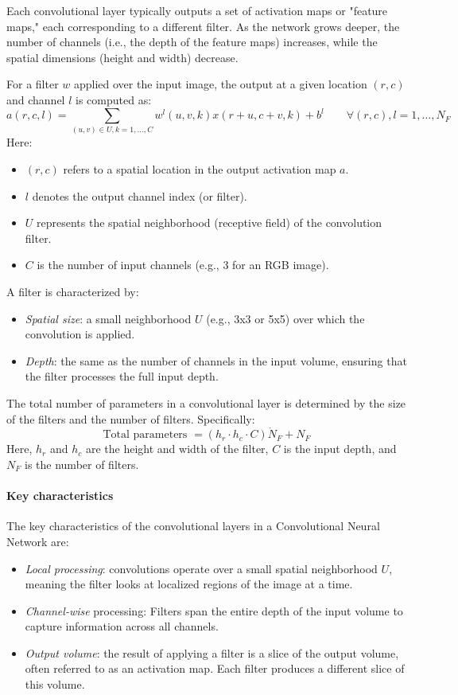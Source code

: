 Each convolutional layer typically outputs a set of activation maps or "feature maps," each corresponding to a different filter. 
As the network grows deeper, the number of channels (i.e., the depth of the feature maps) increases, while the spatial dimensions (height and width) decrease.

For a filter $w$ applied over the input image, the output at a given location $(r, c)$ and channel $l$ is computed as:
\[a(r,c,l)=\sum_{(u,v)\in U,k=1,\dots,C}w^l(u,v,k)x(r+u,c+v,k)+b^l\qquad\forall(r,c),l=1,\dots,N_F\]
Here: 
\begin{itemize}
    \item $(r,c)$ refers to a spatial location in the output activation map $a$.
    \item $l$ denotes the output channel index (or filter). 
    \item $U$ represents the spatial neighborhood (receptive field) of the convolution filter. 
    \item $C$ is the number of input channels (e.g., 3 for an RGB image).
\end{itemize}
A filter is characterized by:
\begin{itemize}
    \item \textit{Spatial size}: a small neighborhood $U$ (e.g., 3x3 or 5x5) over which the convolution is applied.
    \item \textit{Depth}: the same as the number of channels in the input volume, ensuring that the filter processes the full input depth.
\end{itemize}
The total number of parameters in a convolutional layer is determined by the size of the filters and the number of filters. 
Specifically:
\[\text{Total parameters }=(h_r\cdot h_c\cdot C)\dot N_F+N_F\]
Here, $h_r$ and $h_c$ are the height and width of the filter, $C$ is the input depth, and $N_F$ is the number of filters.

\paragraph*{Key characteristics}
The key characteristics of the convolutional layers in a Convolutional Neural Network are: 
\begin{itemize}
    \item \textit{Local processing}: convolutions operate over a small spatial neighborhood $U$, meaning the filter looks at localized regions of the image at a time.
    \item \textit{Channel-wise} processing: Filters span the entire depth of the input volume to capture information across all channels.
    \item \textit{Output volume}: the result of applying a filter is a slice of the output volume, often referred to as an activation map. 
        Each filter produces a different slice of this volume.
\end{itemize}

